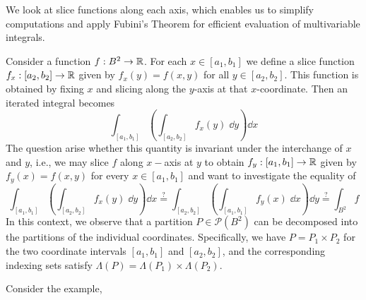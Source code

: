 \documentclass[../Analysis-3.tex]{subfiles}
\begin{document}
We look at slice functions along each axis, which enables us to simplify computations and apply Fubini's Theorem for efficient evaluation of multivariable integrals.

\ssk

Consider a function $ f: B^2 \to \mathbb{R} $. For each $ x \in [a_1, b_1] $ we define a slice function $ f_{x}:[a_2, b_2] \to \mathbb{R} $ given by $ f_{x}(y) = f(x,y) $ for all $ y \in [a_2, b_2] $. This function is obtained by fixing $ x $ and slicing along the $ y $-axis at that $ x $-coordinate. Then an iterated integral becomes
\[  \int_{[a_1, b_1]}\left( \int_{[a_2, b_2]} f_x(y) \; \dd y \right)\dd x  \]
The question arise whether this quantity is invariant under the interchange of $ x $ and $ y $, i.e., we may slice $ f $ along $x-$axis at $ y $ to obtain $ f_y:[a_1, b_1] \to \mathbb{R} $ given by $ f_{y}(x) = f(x,y) $ for every $ x \in [a_1, b_1] $ and want to investigate the equality of
\begin{equation}
  \int_{[a_1, b_1]}\left( \int_{[a_2, b_2]} f_x(y) \; \dd y \right)\dd x \overset{?}{=} \int_{[a_2, b_2]}\left( \int_{[a_1, b_1]} f_y(x) \; \dd x \right)\dd y \overset{?}{=} \int_{B^2} f \label{eq:fubini:cond:check}
\end{equation}
In this context, we observe that a partition $P \in \mathscr{P}(B^2)$ can be decomposed into the partitions of the individual coordinates. Specifically, we have $P = P_1 \times P_2$ for the two coordinate intervals $[a_1, b_1]$ and $[a_2, b_2]$, and the corresponding indexing sets satisfy $\Lambda(P) = \Lambda(P_1) \times \Lambda(P_2)$.

\ssk

Consider the example,
\end{document}
